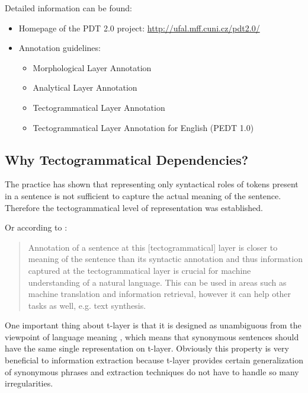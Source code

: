 \medskip
Detailed information can be found:
\begin{itemize}
	\item Homepage of the PDT 2.0 project: \url{http://ufal.mff.cuni.cz/pdt2.0/}
	\item Annotation guidelines:	
	\begin{itemize}
		\item Morphological Layer Annotation \citep{mmanCz2005}
		\item Analytical Layer Annotation \citep{amanEn1999}
		\item Tectogrammatical Layer Annotation \citep{biblio:MiBeAnnotationtectogrammatical2006}
		\item Tectogrammatical Layer Annotation for English (PEDT 1.0) \citep{biblio:CiHaAnnotationEnglish2006}
		
	\end{itemize}	
\end{itemize}

\subsection{Why Tectogrammatical Dependencies?}

The practice has shown that representing only syntactical roles of tokens present in a sentence is not sufficient to capture the actual meaning of the sentence. Therefore the tectogrammatical level of representation was established.

Or according to \cite{biblio:KlTransformationBasedTectogrammatical2006}:

\begin{quote}
Annotation of a sentence at this [tectogrammatical] layer is closer to meaning of the sentence than its syntactic annotation and thus information captured at the tectogrammatical layer is crucial for machine understanding of a natural language. This can be used in areas such as machine translation and information retrieval, however it can help other tasks as well, e.g. text synthesis.	
\end{quote}

One important thing about t-layer is that it is designed as unambiguous from the viewpoint of language meaning \citep{SgallHajicovaPanevova1986}, which means that synonymous sentences should have the same single representation on t-layer. Obviously this property is very beneficial to information extraction because t-layer provides certain generalization of synonymous phrases and extraction techniques do not have to handle so many irregularities. 


